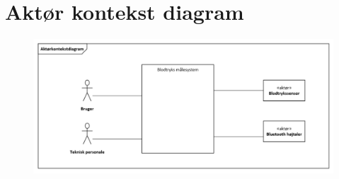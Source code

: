 \section{Aktør kontekst diagram}

\begin{figure}[h!]
	\centering
	\includegraphics[width=0.5\linewidth]{Kravspecifikation/Aktoer_kontekst_diagram}
\end{figure}